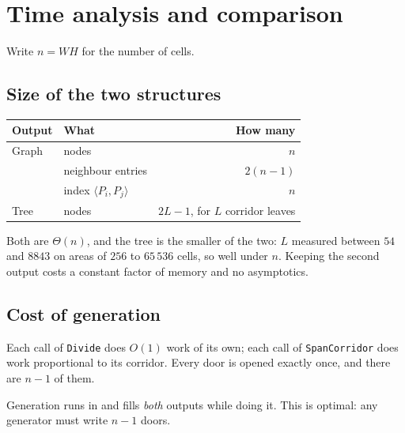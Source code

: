 \section{Time analysis and comparison}
\label{sec:analysis}

Write $n=WH$ for the number of cells.

\subsection{Size of the two structures}

\begin{center}
\begin{tabular}{@{}llr@{}}
  \toprule
  Output & What & How many \\
  \midrule
  Graph & nodes                   & $n$ \\
        & neighbour entries       & $2(n-1)$ \\
        & index $\langle P_i,P_j\rangle$ & $n$ \\
  Tree  & nodes                   & $2L-1$, for $L$ corridor leaves \\
  \bottomrule
\end{tabular}
\end{center}

Both are $\Theta(n)$, and the tree is the smaller of the two: $L$ measured
between $54$ and $8843$ on areas of $256$ to $65\,536$ cells, so well under $n$.
Keeping the second output costs a constant factor of memory and no asymptotics.

\subsection{Cost of generation}

Each call of \texttt{Divide} does $O(1)$ work of its own; each call of
\texttt{SpanCorridor} does work proportional to its corridor. Every door is
opened exactly once, and there are $n-1$ of them.

\begin{keypoint}
Generation runs in  and fills \emph{both} outputs
while doing it. This is optimal: any generator must write $n-1$ doors.
\end{keypoint}

